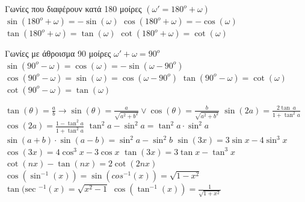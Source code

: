 \documentclass[12pt]{article}
\def\sec{\text{sec\ }} %
\begin{document}
\begin{flushleft}
	\textgreek{Γωνίες που διαφέρουν κατά 180 μοίρες} $ (\omega' = 180^o + \omega ) $ \linebreak 
	\textbullet \quad $\displaystyle \sin (180^o + \omega) = -\sin (\omega) $ \linebreak 
	\textbullet \quad $\displaystyle \cos (180^o + \omega) = -\cos (\omega) $ \linebreak 
	\textbullet \quad $\displaystyle \tan (180^o + \omega) = \tan (\omega) $ \linebreak 
	\textbullet \quad $\displaystyle \cot (180^o + \omega) = \cot (\omega) $ \linebreak 
	
	\textgreek{Γωνίες με άθροισμα 90 μοίρες} $ \omega' + \omega = 90^o $ \linebreak 
	\textbullet \quad $\displaystyle \sin (90^o - \omega) = \cos (\omega) = -\sin (\omega - 90^o) $ \linebreak 
	\textbullet \quad $\displaystyle \cos (90^o - \omega) = \sin (\omega) = \cos (\omega - 90^o) $ \linebreak 
	\textbullet \quad $\displaystyle \tan (90^o - \omega) = \cot (\omega) $ \linebreak 
	\textbullet \quad $\displaystyle \cot (90^o - \omega) = \tan (\omega) $ \linebreak 
	
	\textbullet \quad $\displaystyle  \tan (\theta) = \frac{a}{b} \rightarrow \sin (\theta) = \frac{a}{\sqrt{a^2 + b^2}} \lor \cos (\theta) = \frac{b}{\sqrt{a^2 + b^2}} $ \linebreak
	\textbullet \quad $\displaystyle \sin (2a) = \frac{2\tan \ a}{1 + \tan ^2 a} $ \linebreak 
	\textbullet \quad $\displaystyle \cos (2a) = \frac{1 -\tan ^2 a}{1 + \tan ^2 a} $ \linebreak 
	\textbullet \quad $\displaystyle \tan ^2 a - \sin ^2 a = \tan ^2 a \cdot \sin ^2 a $ \linebreak 
	\textbullet \quad $\displaystyle \sin (a + b) \cdot \sin (a -b ) = \sin ^2 a - \sin ^2 b $ \linebreak 
	\textbullet \quad $\displaystyle \sin (3x) = 3\sin x - 4\sin ^3 x $ \linebreak 
	\textbullet \quad $\displaystyle \cos (3x) = 4\cos ^3 x - 3\cos x $ \linebreak 
	\textbullet \quad $\displaystyle \tan (3x) = 3\tan x - \tan ^3 x $ \linebreak 
	\textbullet \quad $\displaystyle \cot (nx) - \tan (nx) = 2\cot (2nx) $ \linebreak 
	\textbullet \quad $\displaystyle \cos (\sin ^{-1} (x) ) = \sin (cos ^{-1} (x)) = \sqrt{1 - x^2} $ \linebreak 
	\textbullet \quad $\displaystyle \tan (\sec ^{-1} (x) = \sqrt{x^2 - 1} $ \linebreak 
	\textbullet \quad $\displaystyle \cos (\tan ^{-1} (x)) = \frac{1}{\sqrt{1 + x^2}} $ \linebreak 
	

\end{flushleft}
\end{document}
